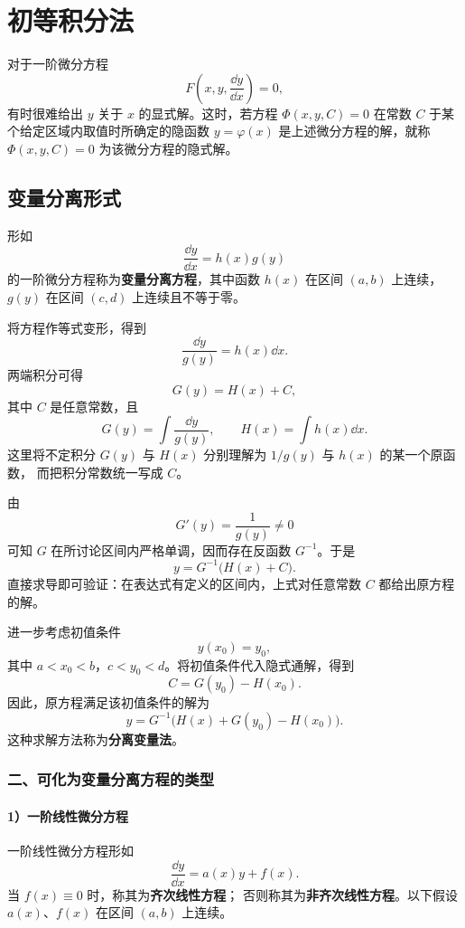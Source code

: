 \setchapterintro{}
\chapter{初等积分法}\label{chap:初等积分法}

对于一阶微分方程
\[
	F\left(x,y,\dfrac{\dd y}{\dd x}\right)=0,
\]
有时很难给出 $y$ 关于 $x$ 的显式解。这时，若方程 $\Phi(x,y,C)=0$
在常数 $C$ 于某个给定区域内取值时所确定的隐函数 $y=\varphi(x)$
是上述微分方程的解，就称 $\Phi(x,y,C)=0$ 为该微分方程的隐式解。

\section{变量分离形式}\label{sec:变量分离形式}

\begin{definition}\label{def:变量分离方程}
	形如
\[
	\dfrac{\dd y}{\dd x}=h(x)g(y)
\]
的一阶微分方程称为\textbf{变量分离方程}，其中函数 $h(x)$ 在区间 $(a,b)$
上连续，$g(y)$ 在区间 $(c,d)$ 上连续且不等于零。
\end{definition}

将方程作等式变形，得到
\[
	\dfrac{\dd y}{g(y)}=h(x)\dd x.
\]
两端积分可得
\[
	G(y)=H(x)+C,
\]
其中 $C$ 是任意常数，且
\[
	G(y)=\int\dfrac{\dd y}{g(y)},
	\qquad
	H(x)=\int h(x)\dd x.
\]
这里将不定积分 $G(y)$ 与 $H(x)$ 分别理解为 $1/g(y)$ 与 $h(x)$ 的某一个原函数，
而把积分常数统一写成 $C$。

由
\[
	G'(y)=\dfrac{1}{g(y)}\neq 0
\]
可知 $G$ 在所讨论区间内严格单调，因而存在反函数 $G^{-1}$。于是
\[
	y=G^{-1}\bigl(H(x)+C\bigr).
\]
直接求导即可验证：在表达式有定义的区间内，上式对任意常数 $C$
都给出原方程的解。

进一步考虑初值条件
\[
	y(x_0)=y_0,
\]
其中 $a<x_0<b$，$c<y_0<d$。将初值条件代入隐式通解，得到
\[
	C=G(y_0)-H(x_0).
\]
因此，原方程满足该初值条件的解为
\[
	y=G^{-1}\bigl(H(x)+G(y_0)-H(x_0)\bigr).
\]
这种求解方法称为\textbf{分离变量法}。

\subsection*{二、可化为变量分离方程的类型}

\subsubsection*{1）一阶线性微分方程}

一阶线性微分方程形如
\[
	\dfrac{\dd y}{\dd x}=a(x)y+f(x).
\]
当 $f(x)\equiv 0$ 时，称其为\textbf{齐次线性方程}；
否则称其为\textbf{非齐次线性方程}。以下假设 $a(x)$、$f(x)$ 在区间 $(a,b)$ 上连续。


